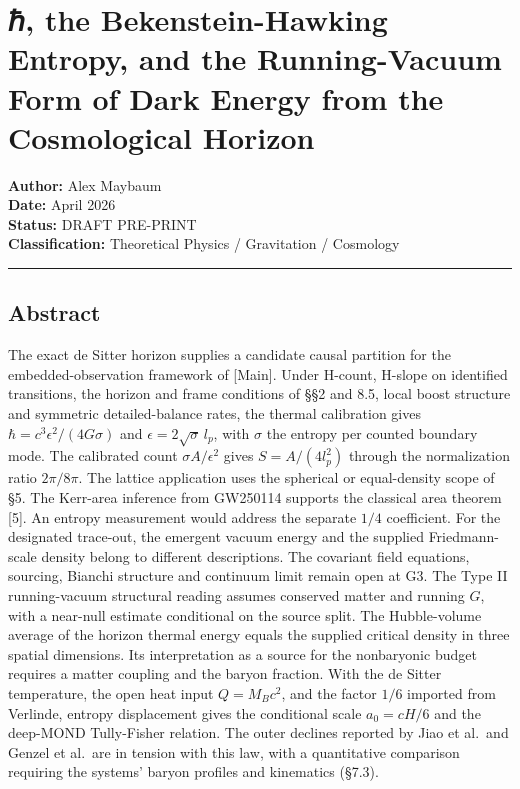 \documentclass[
]{article}
\author{}
\date{}
\begin{document}
\hypertarget{ux210f-the-bekenstein-hawking-entropy-and-the-running-vacuum-form-of-dark-energy-from-the-cosmological-horizon}{%
\section{ℏ, the Bekenstein-Hawking Entropy, and the Running-Vacuum Form
of Dark Energy from the Cosmological
Horizon}\label{ux210f-the-bekenstein-hawking-entropy-and-the-running-vacuum-form-of-dark-energy-from-the-cosmological-horizon}}

\textbf{Author:} Alex Maybaum\\
\textbf{Date:} April 2026\\
\textbf{Status:} DRAFT PRE-PRINT\\
\textbf{Classification:} Theoretical Physics / Gravitation / Cosmology

\begin{center}\rule{0.5\linewidth}{0.5pt}\end{center}

\hypertarget{abstract}{%
\subsection{Abstract}\label{abstract}}

The exact de Sitter horizon supplies a candidate causal partition for
the embedded-observation framework of {[}Main{]}. Under H-count, H-slope
on identified transitions, the horizon and frame conditions of §§2 and
8.5, local boost structure and symmetric detailed-balance rates, the
thermal calibration gives \(\hbar=c^3\epsilon^2/(4G\sigma)\) and
\(\epsilon=2\sqrt{\sigma}\,l_p\), with \(\sigma\) the entropy per
counted boundary mode. The calibrated count \(\sigma A/\epsilon^2\)
gives \(S=A/(4l_p^2)\) through the normalization ratio \(2\pi/8\pi\).
The lattice application uses the spherical or equal-density scope of §5.
The Kerr-area inference from GW250114 supports the classical area
theorem {[}5{]}. An entropy measurement would address the separate
\(1/4\) coefficient. For the designated trace-out, the emergent vacuum
energy and the supplied Friedmann-scale density belong to different
descriptions. The covariant field equations, sourcing, Bianchi structure
and continuum limit remain open at G3. The Type II running-vacuum
structural reading assumes conserved matter and running \(G\), with a
near-null estimate conditional on the source split. The Hubble-volume
average of the horizon thermal energy equals the supplied critical
density in three spatial dimensions. Its interpretation as a source for
the nonbaryonic budget requires a matter coupling and the baryon
fraction. With the de Sitter temperature, the open heat input
\(Q=M_Bc^2\), and the factor \(1/6\) imported from Verlinde, entropy
displacement gives the conditional scale \(a_0=cH/6\) and the deep-MOND
Tully-Fisher relation. The outer declines reported by Jiao et al.~and
Genzel et al.~are in tension with this law, with a quantitative
comparison requiring the systems' baryon profiles and kinematics (§7.3).
\end{document}
